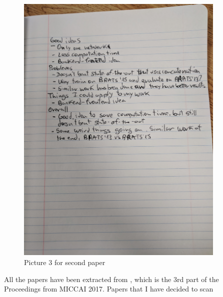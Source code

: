 \documentclass{article}
\begin{document}
\begin{figure}[h]
\centering
\includegraphics[width=10cm]{paper2_3.jpg}
\caption{Picture 3 for second paper}
\label{fig:paper2_3}
\end{figure}



All the papers have been extracted from \cite{MICCAI}, which is the 3rd part of the Proceedings from MICCAI 2017. 
Papers that I have decided to scan \cite{10.1007/978-3-319-66179-7_1,10.1007/978-3-319-66179-7_5,10.1007/978-3-319-66179-7_10,10.1007/978-3-319-66179-7_26,10.1007/978-3-319-66179-7_27,10.1007/978-3-319-66179-7_33,10.1007/978-3-319-66179-7_36,10.1007/978-3-319-66179-7_38}


\nocite{*}

\printbibliography
\end{document}
